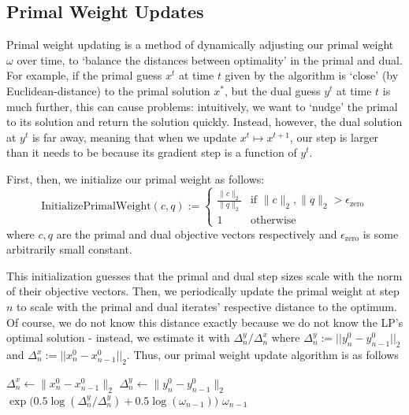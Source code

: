 \documentclass[twoside,12pt,openright]{report}  %
\begin{document}
\subsection{Primal Weight Updates}\label{sec:primal_weight}
Primal weight updating is a method of dynamically adjusting our primal weight $\omega$ over time, to `balance the distances between optimality' in the primal and dual. For example, if the primal guess $x^t$ at time $t$ given by the algorithm is `close' (by Euclidean-distance) to the primal solution $x^*$, but the dual guess $y^t$ at time $t$ is much further, this can cause problems: intuitively, we want to `nudge' the primal to its solution and return the solution quickly. Instead, however, the dual solution at $y^{t}$ is far away, meaning that when we update $x^t \mapsto x^{t+1}$, our step is larger than it needs to be because its gradient step is a function of $y^t$.

First, then, we initialize our primal weight as follows:
\[
\text{InitializePrimalWeight}(c, q) := \begin{cases}
{\frac{\|c\|_2}{\|q\|_2}} & \text{if } \|c\|_2, \|q\|_2 > \epsilon_{\text{zero}} \\
1 & \text{otherwise}
\end{cases}
\] where $c,q$ are the primal and dual objective vectors respectively and $\epsilon_{\text{zero}}$ is some arbitrarily small constant. 

This initialization guesses that the primal and dual step sizes scale with the norm of their objective vectors. Then, we periodically update the primal weight at step $n$ to scale with the primal and dual iterates' respective distance to the optimum. Of course, we do not know this distance exactly because we do not know the LP's optimal solution - instead, we estimate it with $\Delta_n^y/\Delta_n^x$ where $\Delta_n^y := ||y^0_n-y^0_{n-1}||_2$ and $\Delta_n^x := ||x^0_n-x^0_{n-1}||_2$. Thus, our primal weight update algorithm is as follows

\begin{algorithm}[H]
\begin{algorithmic}[1]
\caption{Primal Weight Update($x_n^0, x_{n-1}^0, y_n^0, y_{n-1}^0\omega_{n-1}$)\cite{Applegate_2022}:}
\label{alg:primal_weight}
        \State $\Delta_n^x \leftarrow \|x_n^0 - x_{n-1}^0\|_2$
        \State $\Delta_n^y \leftarrow \|y_n^0 - y_{n-1}^0\|_2$
        \State \Return $\exp\Big(0.5 \log \left (\Delta_n^y/\Delta_n^y \right) + 0.5 \log (\omega_{n-1}) \Big)$
        \Else
        \State \Return $\omega_{n-1}$
        \EndIf
        
\end{algorithmic}
\end{algorithm}
\end{document}

